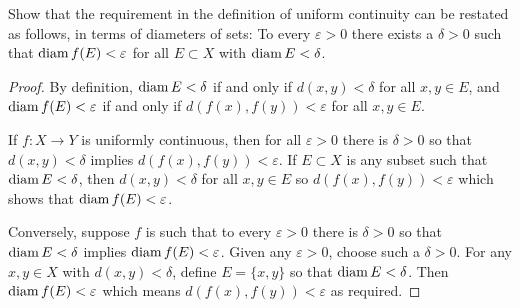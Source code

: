 \label{exercise:continuity:diam-characterization-of-uniform}
Show that the requirement in the definition of uniform continuity can
be restated as follows, in terms of diameters of sets: To every
$\varepsilon > 0$ there exists a $\delta > 0$ such that
$\operatorname{diam} f(E) < \varepsilon$ for all $E\subset X$ with
$\operatorname{diam} E < \delta$.
\begin{proof}
  By definition, $\operatorname{diam} E < \delta$ if and only if $d(x,y) < \delta$
  for all $x,y\in E$, and $\operatorname{diam} f(E) < \varepsilon$ if and only if
  $d(f(x),f(y)) < \varepsilon$ for all $x,y\in E$.

  If $f\colon X\to Y$ is uniformly continuous, then for all
  $\varepsilon > 0$ there is $\delta > 0$ so that $d(x,y) < \delta$
  implies $d(f(x),f(y)) < \varepsilon$. If $E\subset X$ is any subset
  such that $\operatorname{diam} E < \delta$, then $d(x,y) < \delta$ for all
  $x,y\in E$ so $d(f(x),f(y)) < \varepsilon$ which shows that
  $\operatorname{diam} f(E) < \varepsilon$.

  Conversely, suppose $f$ is such that to every $\varepsilon > 0$
  there is $\delta > 0$ so that $\operatorname{diam} E < \delta$ implies
  $\operatorname{diam} f(E) < \varepsilon$. Given any $\varepsilon > 0$, choose such
  a $\delta > 0$. For any $x,y\in X$ with $d(x,y) < \delta$, define
  $E = \{x,y\}$ so that $\operatorname{diam} E < \delta$. Then
  $\operatorname{diam} f(E) < \varepsilon$ which means $d(f(x),f(y)) < \varepsilon$
  as required.
\end{proof}

